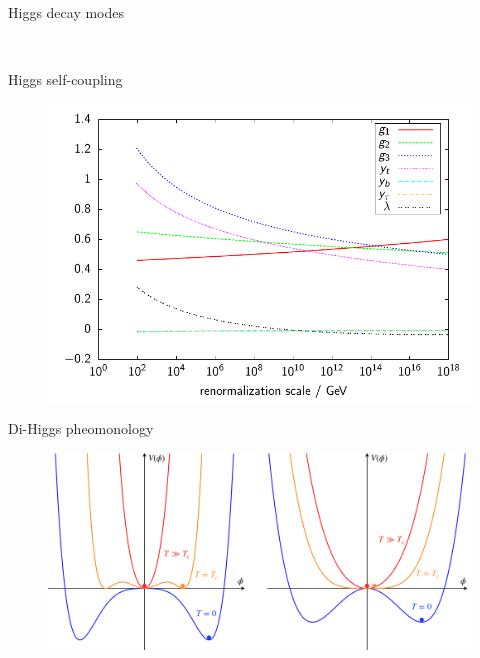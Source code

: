 \begin{frame}{Higgs decay modes}
    
\begin{figure}
    \centering
     \\
\end{figure}
\end{frame}

\begin{frame}{Higgs self-coupling}
\begin{figure}
    \centering
    \includegraphics[width=.7\textwidth]{BackUp/Part1/Img/SM_rgflow.pdf}
\end{figure}    
    
\end{frame}

\begin{frame}{Di-Higgs pheomonology}
\begin{figure}
    \centering
    \includegraphics[width=1.\textwidth]{BackUp/Part1/Img/Higgs_shape_T.png}
\end{figure}
\end{frame}

